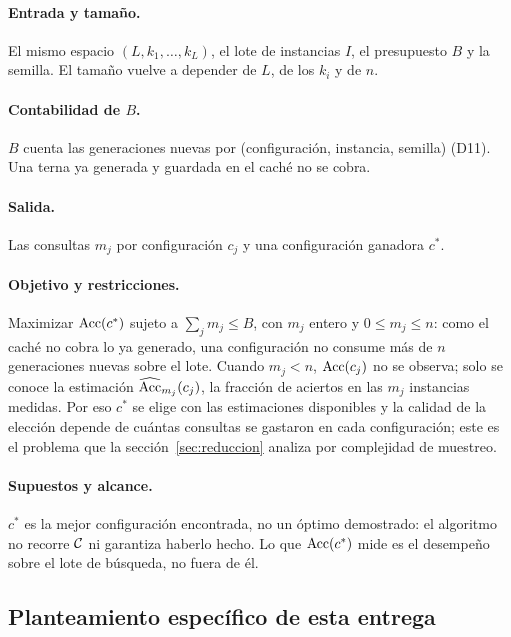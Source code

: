 \paragraph{Entrada y tamaño.} El mismo espacio $(L,k_1,\dots,k_L)$, el lote de instancias
$I$, el presupuesto $B$ y la semilla. El tamaño vuelve a depender de $L$, de los $k_i$ y de $n$.

\paragraph{Contabilidad de $B$.} $B$ cuenta las generaciones nuevas por (configuración,
instancia, semilla) (D11). Una terna ya generada y guardada en el caché no se cobra.

\paragraph{Salida.} Las consultas $m_j$ por configuración $c_j$ y una configuración
ganadora $c^*$.

\paragraph{Objetivo y restricciones.} Maximizar $\operatorname{Acc}(c^*)$ sujeto a $\sum_j m_j\le B$,
con $m_j$ entero y $0\le m_j\le n$: como el caché no cobra lo ya generado, una
configuración no consume más de $n$ generaciones nuevas sobre el lote. Cuando $m_j<n$,
$\operatorname{Acc}(c_j)$ no se observa; solo se conoce la estimación $\widehat{\operatorname{Acc}}_{m_j}(c_j)$, la
fracción de aciertos en las $m_j$ instancias medidas. Por eso $c^*$ se elige con las
estimaciones disponibles y la calidad de la elección depende de cuántas consultas se
gastaron en cada configuración; este es el problema que la sección~\ref{sec:reduccion}
analiza por complejidad de muestreo.

\paragraph{Supuestos y alcance.} $c^*$ es la mejor configuración encontrada, no un óptimo
demostrado: el algoritmo no recorre $\mathcal{C}$ ni garantiza haberlo hecho. Lo que $\operatorname{Acc}(c^*)$
mide es el desempeño sobre el lote de búsqueda, no fuera de él.

\subsection{Planteamiento específico de esta entrega}

